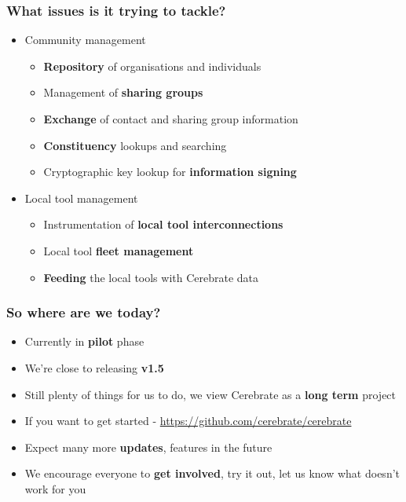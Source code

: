 \begin{frame}
	\frametitle{What issues is it trying to tackle?}
	\begin{itemize}
                \item Community management
		\begin{itemize}
                    \item {\bf Repository} of organisations and individuals
                    \item Management of {\bf sharing groups}
                    \item {\bf Exchange} of contact and sharing group information
                    \item {\bf Constituency} lookups and searching 
                    \item Cryptographic key lookup for {\bf information signing}
		\end{itemize}
                \item Local tool management
		\begin{itemize}
                    \item Instrumentation of {\bf local tool interconnections}
                    \item Local tool {\bf fleet management}
                    \item {\bf Feeding} the local tools with Cerebrate data
                \end{itemize}
	\end{itemize}
\end{frame}

\begin{frame}
	\frametitle{So where are we today?}
	\begin{itemize}
                \item Currently in {\bf pilot} phase
                \item We're close to releasing {\bf v1.5}
                \item Still plenty of things for us to do, we view Cerebrate as a {\bf long term} project
                \item If you want to get started - \url{https://github.com/cerebrate/cerebrate}
                \item Expect many more {\bf updates}, features in the future
                \item We encourage everyone to {\bf get involved}, try it out, let us know what doesn't work for you
	\end{itemize}
\end{frame}

